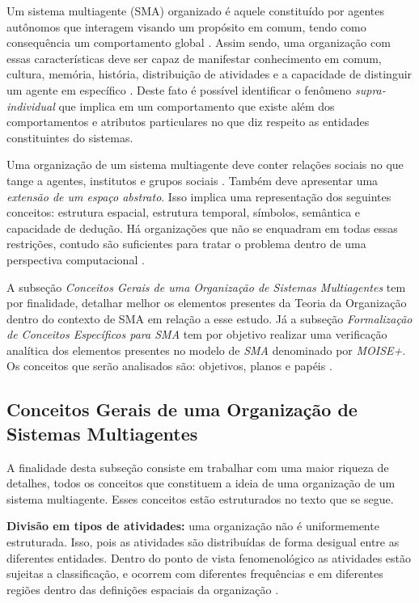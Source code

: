 Um sistema multiagente (SMA) organizado é aquele constituído por agentes autônomos que interagem visando um propósito em comum, tendo como consequência um comportamento global \cite{moiseframework} \cite{organiationofmultiagentsystem}. Assim sendo, uma organização com essas características deve ser capaz de manifestar conhecimento em comum, cultura, memória, história, distribuição de atividades e a capacidade de distinguir um  agente em específico \cite{organiationofmultiagentsystem}. Deste fato é possível identificar o fenômeno \textit{supra-individual} que implica em um comportamento que existe além dos comportamentos e atributos particulares no que diz respeito as entidades constituintes do sistemas. 

Uma organização de um sistema multiagente deve conter relações sociais no que tange a agentes, institutos e grupos sociais \cite{organiationofmultiagentsystem}. Também deve apresentar uma \textit{extensão de um espaço abstrato}. Isso implica uma representação dos seguintes conceitos: estrutura espacial, estrutura temporal, símbolos, semântica e capacidade de dedução. Há organizações que não se enquadram em todas essas restrições, contudo são suficientes para tratar o problema dentro de uma perspectiva computacional \cite{organiationofmultiagentsystem}.

A subseção \textit{Conceitos Gerais de uma Organização de Sistemas Multiagentes} tem por finalidade, detalhar melhor os elementos presentes da Teoria da Organização dentro do contexto de SMA em relação a esse estudo. Já a subseção \textit{Formalização de Conceitos Específicos para SMA} tem por objetivo realizar uma verificação analítica dos elementos presentes no modelo de \textit{SMA} denominado por \textit{MOISE+}. Os conceitos que serão analisados são: objetivos, planos e papéis \cite{organiationofmultiagentsystem}.
   

\subsection{Conceitos Gerais de uma Organização de Sistemas Multiagentes}

A finalidade desta subseção consiste em trabalhar com uma maior riqueza de detalhes, todos os conceitos que constituem a ideia de uma organização de um sistema multiagente. Esses conceitos estão estruturados no texto que se segue.
  
\textbf{Divisão em tipos de atividades:} uma organização não é uniformemente estruturada. Isso, pois as atividades são distribuídas de forma desigual entre as diferentes entidades. Dentro do ponto de vista fenomenológico as atividades estão sujeitas a classificação, e ocorrem com diferentes frequências e em diferentes regiões dentro das definições espaciais da organização \cite{organiationofmultiagentsystem}.

